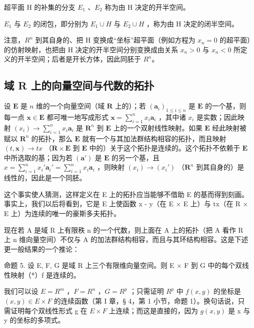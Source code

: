 超平面 H 的补集的分支 \(E_{1}\) 、\(E_{2}\) 称为由 H 决定的开半空间。

\(E_{1}\) 与 \(E_{2}\) 的闭包，即分别为 \(E_{1} \cup H\) 与 \(E_{2} \cup H\) ，称为由 H 决定的闭半空间。

注意，\(R^{n}\) 到其自身的、把 H 变换成“坐标”超平面（例如方程为 \(x_{n}=0\) 的超平面）的仿射映射，也把由 H 决定的开半空间分别变换成由关系 \(x_{n}>0\) 与 \(x_{n}<0\) 所定义的开半空间；后者是开长方体，因此同胚于 \(R^{n}\)。

\subsection{域 R 上的向量空间与代数的拓扑}

设 \(\mathbf{E}\) 是 \(n\) 维的一个向量空间（域 \(\mathbf{R}\) 上的）；若 \((\boldsymbol{a}_i)_{1 \leqslant i \leqslant n}\) 是 \(\mathbf{E}\) 的一个基，则每一点 \(\boldsymbol{x} \in \mathbf{E}\) 都可唯一地写成形式 \(\boldsymbol{x} = \sum_{i=1}^{n} x_i \boldsymbol{a}_i\) ，其中诸 \(x_i\) 是实数；因此映射 \((x_i) \to \sum_{i=1}^{n} x_i \boldsymbol{a}_i\) 是 \(\mathbf{R}^n\) 到 \(\mathbf{E}\) 上的一个双射线性映射。如果 \(\mathbf{E}\) 经此映射被赋以 \(\mathbf{R}^n\) 的拓扑，那么 \(\mathbf{E}\) 就有一个与其加法群结构相容的拓扑，而且映射 \((t, \boldsymbol{x}) \to tx\) （\(\mathbf{R} \times \mathbf{E}\) 到 \(\mathbf{E}\) 中的）关于这个拓扑是连续的。这个拓扑不依赖于 \(\mathbf{E}\) 中所选取的基；因为若 \((\boldsymbol{a}')\) 是 \(\mathbf{E}\) 的另一个基，且 \(x = \sum_{i=1}^{n} x_i' \boldsymbol{a}_i' = \sum_{i=1}^{n} x_i \boldsymbol{a}_i\) ，则映射 \((x_i) \to (x_i')\) （\(\mathbf{R}^n\) 到其自身的）是线性的，因此是一个同胚。

这个事实使人猜测，这样定义在 E 上的拓扑应当能够不借助 E 的基而得到刻画。事实上，我们以后将看到，它是 E 上使函数 x - y（在 E × E 上）与 tx（在 R × E 上）为连续的唯一的豪斯多夫拓扑。

现在若 A 是域 R 上有限秩 n 的一个代数，则上面在 A 上的拓扑（把 A 看作 R 上 n 维向量空间）不仅与 A 的加法群结构相容，而且与其环结构相容。这是下述更一般结果的一个推论：

命题 5. 设 E, F, G 是域 R 上三个有限维向量空间。则 E × F 到 G 中的每个双线性映射（*）f 是连续的。

我们可以设 \(E = R^{m}\) ，\(F = R^{n}\) ，\(G = R^{p}\) ；只需证明 \(R^{p}\) 中 \(f(x, y)\) 的坐标是 \((x, y) \in E \times F\) 的连续函数（第 I 章，§ 4，第 1 小节，命题 1）。换句话说，只需证明每个双线性形式 g 在 \(E \times F\) 上连续；而这是直接的，因为 \(g(x, y)\) 是 x 与 y 的坐标的多项式。

